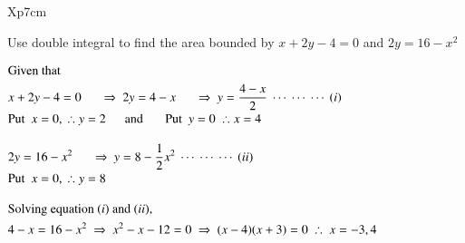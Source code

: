 \documentclass[11pt]{extarticle}
\begin{document}
\begin{tabularx}{\textwidth}{Xp{7cm}}
\begin{adjustbox}{valign=t}
   \end{adjustbox}
\end{tabularx}

\vspace{5ex}
\textbf{\mred{\#}} Use double integral to find the area bounded by $x+2y-4=0$ and $2y=16-x^2$



\begin{minipage}[t]{0.66\linewidth}
   \noindent
   \begin{adjustbox}{valign=t}
      $\begin{aligned}
         & \text{Given that }\\
         & x+2y-4=0 \ \ \ \ \ \  \Rightarrow \ 2y = 4-x \ \ \ \ \ \  
         \Rightarrow \  y = \frac{4-x}{2} \ \cdots \ \cdots \ \cdots \ (i) \\[-0.5ex]
         & \text{Put }\ x=0, \ \therefore y=2
         \text{\ \ \ \ \ \ and \ \ \ \ \ \ Put }\ y=0 \ \therefore x=4\\[2ex]
         & 2y=16-x^2 \ \ \ \ \ \  \Rightarrow \  y = 8-\frac{1}{2}x^2 \ \cdots \ \cdots \ \cdots \ (ii)\\[-0.5ex]
         & \text{Put }\ x=0, \ \therefore y=8\\[2ex]
         & \text{Solving equation } (i) \text{ and } (ii),\\
         & 4-x = 16-x^2 \ \Rightarrow \  x^2-x-12=0 \ \Rightarrow \  (x-4)(x+3) = 0 \ \therefore \ x=-3,4
      \end{aligned}$
      \divideX
   \end{adjustbox}
\end{minipage}
\end{document}
